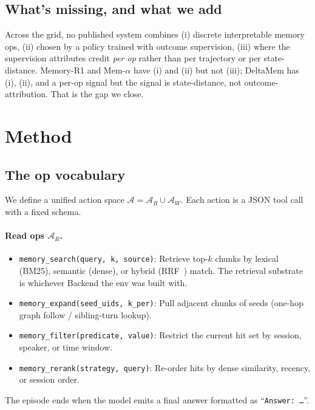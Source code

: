 \documentclass[11pt]{article}
\begin{document}
\subsection{What's missing, and what we add}

Across the grid, no published system combines (i) discrete
interpretable memory ops, (ii) chosen by a policy trained with
outcome supervision, (iii) where the supervision attributes credit
\emph{per op} rather than per trajectory or per state-distance.
Memory-R1 and Mem-$\alpha$ have (i) and (ii) but not (iii); DeltaMem
has (i), (ii), and a per-op signal but the signal is state-distance,
not outcome-attribution. That is the gap we close.

\section{Method}
\label{sec:method}

\subsection{The op vocabulary}

We define a unified action space $\mathcal{A} = \mathcal{A}_R \cup
\mathcal{A}_W$. Each action is a JSON tool call with a fixed schema.

\paragraph{Read ops $\mathcal{A}_R$.}
\begin{itemize}
  \item \texttt{memory\_search(query, k, source)}: Retrieve top-$k$ chunks
    by lexical (BM25), semantic (dense), or hybrid (RRF~\cite{shao2024deepseekmath})
    match. The retrieval substrate is whichever Backend the env was built
    with.
  \item \texttt{memory\_expand(seed\_uids, k\_per)}: Pull adjacent chunks
    of seeds (one-hop graph follow / sibling-turn lookup).
  \item \texttt{memory\_filter(predicate, value)}: Restrict the current
    hit set by session, speaker, or time window.
  \item \texttt{memory\_rerank(strategy, query)}: Re-order hits by dense
    similarity, recency, or session order.
\end{itemize}
The episode ends when the model emits a final answer formatted as
``\texttt{Answer: \ldots}''.
\end{document}
